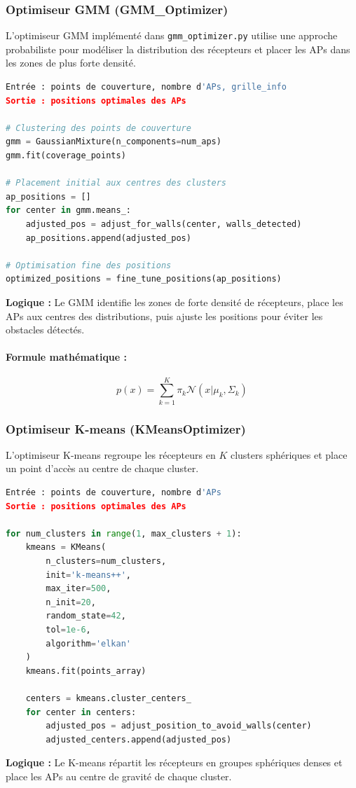 \documentclass[12pt,a4paper]{article}
\begin{document}
\subsubsection{Optimiseur GMM (GMM\_Optimizer)}
L'optimiseur GMM implémenté dans \texttt{gmm\_optimizer.py} utilise une approche probabiliste pour modéliser la distribution des récepteurs et placer les APs dans les zones de plus forte densité.
\begin{lstlisting}[language=Python,caption={Pseudo-code GMM Optimizer}]
Entrée : points de couverture, nombre d'APs, grille_info
Sortie : positions optimales des APs

# Clustering des points de couverture
gmm = GaussianMixture(n_components=num_aps)
gmm.fit(coverage_points)

# Placement initial aux centres des clusters
ap_positions = []
for center in gmm.means_:
    adjusted_pos = adjust_for_walls(center, walls_detected)
    ap_positions.append(adjusted_pos)

# Optimisation fine des positions
optimized_positions = fine_tune_positions(ap_positions)
\end{lstlisting}
\textbf{Logique :} Le GMM identifie les zones de forte densité de récepteurs, place les APs aux centres des distributions, puis ajuste les positions pour éviter les obstacles détectés.

\paragraph{Formule mathématique :}
\begin{equation}
p(x) = \sum_{k=1}^{K} \pi_k \mathcal{N}(x | \mu_k, \Sigma_k)
\end{equation}



\subsubsection{Optimiseur K-means (KMeansOptimizer)}
L'optimiseur K-means regroupe les récepteurs en $K$ clusters sphériques et place un point d'accès au centre de chaque cluster.
\begin{lstlisting}[language=Python,caption={Pseudo-code K-means Optimizer}]
Entrée : points de couverture, nombre d'APs
Sortie : positions optimales des APs

for num_clusters in range(1, max_clusters + 1):
    kmeans = KMeans(
        n_clusters=num_clusters,
        init='k-means++',
        max_iter=500,
        n_init=20,
        random_state=42,
        tol=1e-6,
        algorithm='elkan'
    )
    kmeans.fit(points_array)

    centers = kmeans.cluster_centers_
    for center in centers:
        adjusted_pos = adjust_position_to_avoid_walls(center)
        adjusted_centers.append(adjusted_pos)
\end{lstlisting}
\textbf{Logique :} Le K-means répartit les récepteurs en groupes sphériques denses et place les APs au centre de gravité de chaque cluster.
\end{document}
